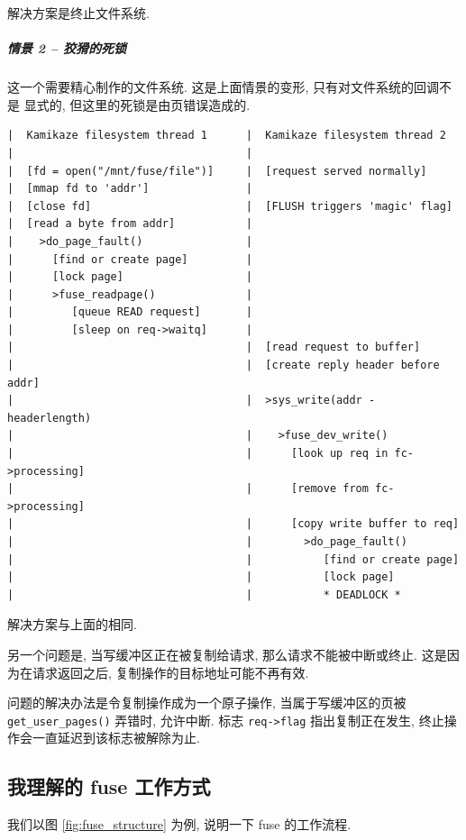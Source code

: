 \documentclass[nofonts, titlepage]{ctexart}
\begin{document}
解决方案是终止文件系统.

\subparagraph{情景 2 --
狡猾的死锁}\label{ux60c5ux666f-2-ux72e1ux733eux7684ux6b7bux9501}

这一个需要精心制作的文件系统. 这是上面情景的变形,
只有对文件系统的回调不是 显式的, 但这里的死锁是由页错误造成的.

\begin{verbatim}
|  Kamikaze filesystem thread 1      |  Kamikaze filesystem thread 2
|                                    |
|  [fd = open("/mnt/fuse/file")]     |  [request served normally]
|  [mmap fd to 'addr']               |
|  [close fd]                        |  [FLUSH triggers 'magic' flag]
|  [read a byte from addr]           |
|    >do_page_fault()                |
|      [find or create page]         |
|      [lock page]                   |
|      >fuse_readpage()              |
|         [queue READ request]       |
|         [sleep on req->waitq]      |
|                                    |  [read request to buffer]
|                                    |  [create reply header before addr]
|                                    |  >sys_write(addr - headerlength)
|                                    |    >fuse_dev_write()
|                                    |      [look up req in fc->processing]
|                                    |      [remove from fc->processing]
|                                    |      [copy write buffer to req]
|                                    |        >do_page_fault()
|                                    |           [find or create page]
|                                    |           [lock page]
|                                    |           * DEADLOCK *
\end{verbatim}

解决方案与上面的相同.

另一个问题是, 当写缓冲区正在被复制给请求, 那么请求不能被中断或终止.
这是因 为在请求返回之后, 复制操作的目标地址可能不再有效.

问题的解决办法是令复制操作成为一个原子操作, 当属于写缓冲区的页被
\texttt{get\_user\_pages()} 弄错时, 允许中断. 标志
\texttt{req-\textgreater{}flag} 指出复制正在发生,
终止操作会一直延迟到该标志被解除为止.

\subsection{我理解的 fuse
工作方式}\label{ux6211ux7406ux89e3ux7684-fuse-ux5de5ux4f5cux65b9ux5f0f}

我们以图 \ref{fig:fuse_structure} 为例, 说明一下 fuse 的工作流程.
\end{document}
